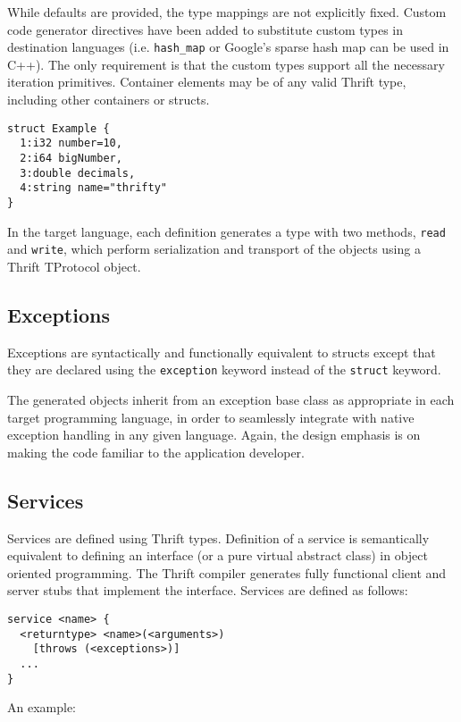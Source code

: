 \documentclass[nocopyrightspace,blockstyle]{sigplanconf}
\begin{document}
While defaults are provided, the type mappings are not explicitly fixed. Custom
code generator directives have been added to substitute custom types in
destination languages (i.e.
\texttt{hash\_map} or Google's sparse hash map can be used in C++). The
only requirement is that the custom types support all the necessary iteration
primitives. Container elements may be of any valid Thrift type, including other
containers or structs.

\begin{verbatim}
struct Example {
  1:i32 number=10,
  2:i64 bigNumber,
  3:double decimals,
  4:string name="thrifty"
}\end{verbatim}

In the target language, each definition generates a type with two methods,
\texttt{read} and \texttt{write}, which perform serialization and transport
of the objects using a Thrift TProtocol object.

\subsection{Exceptions}

Exceptions are syntactically and functionally equivalent to structs except
that they are declared using the \texttt{exception} keyword instead of the
\texttt{struct} keyword.

The generated objects inherit from an exception base class as appropriate
in each target programming language, in order to seamlessly
integrate with native exception handling in any given
language. Again, the design emphasis is on making the code familiar to the
application developer.

\subsection{Services}

Services are defined using Thrift types. Definition of a service is
semantically equivalent to defining an interface (or a pure virtual abstract
class) in object oriented
programming. The Thrift compiler generates fully functional client and
server stubs that implement the interface. Services are defined as follows:

\begin{verbatim}
service <name> {
  <returntype> <name>(<arguments>)
    [throws (<exceptions>)]
  ...
}\end{verbatim}

An example:
\end{document}
